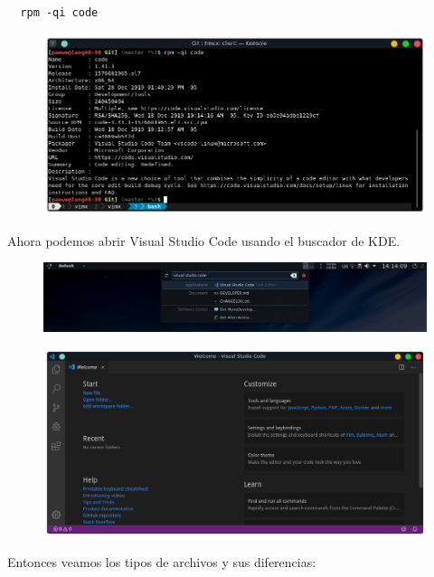 \documentclass{article}
\begin{document}
\begin{verbatim}
  rpm -qi code
\end{verbatim}

\begin{figure}[h!]
  \centering
  \includegraphics[scale=0.75]{./Pictures/055_code_installed.png}
\end{figure}

Ahora podemos abrir Visual Studio Code usando el buscador de KDE.

\begin{figure}[h!]
  \centering
  \includegraphics[scale=0.5]{./Pictures/048_krunner_vscode.png}
\end{figure}

\begin{figure}[h!]
  \centering
  \includegraphics[scale=0.5]{./Pictures/049_vscode.png}
\end{figure}

Entonces veamos los tipos de archivos y sus diferencias:
\end{document}
